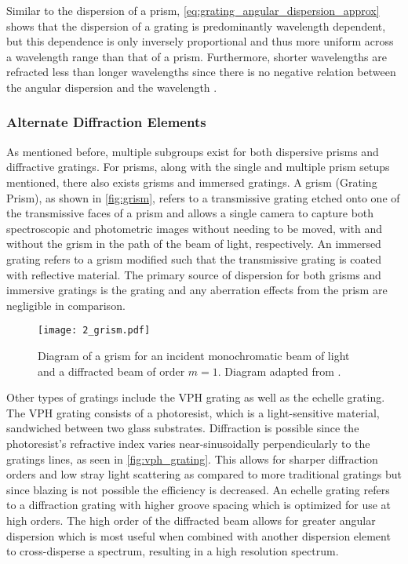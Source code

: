 Similar to the dispersion of a prism, \autoref{eq:grating_angular_dispersion_approx} shows that the dispersion of a grating is predominantly wavelength dependent, but this dependence is only inversely proportional and thus more uniform across a wavelength range than that of a prism.
Furthermore, shorter wavelengths are refracted less than longer wavelengths since there is no negative relation between the angular dispersion and the wavelength \citep{BirneyObsAstro, Hecht_optics,MKS_Handbook}.

\subsubsection{Alternate Diffraction Elements}

As mentioned before, multiple subgroups exist for both dispersive prisms and diffractive gratings.
For prisms, along with the single and multiple prism setups mentioned, there also exists grisms and immersed gratings.
A grism (Grating Prism), as shown in \autoref{fig:grism}, refers to a transmissive grating etched onto one of the transmissive faces of a prism and allows a single camera to capture both spectroscopic and photometric images without needing to be moved, with and without the grism in the path of the beam of light, respectively.
An immersed grating refers to a grism modified such that the transmissive grating is coated with reflective material.
The primary source of dispersion for both grisms and immersive gratings is the grating and any aberration effects from the prism are negligible in comparison.

\enlargethispage{-1\baselineskip}

\begin{figure}[t]
    \centering
    \texttt{[image: 2\_grism.pdf]}
    \caption{
        Diagram of a grism for an incident monochromatic beam of light and a diffracted beam of order $m = 1$.
        Diagram adapted from \cite{BirneyObsAstro}.
    }
    \label{fig:grism}
\end{figure}

Other types of gratings include the \gls{VPH} grating as well as the echelle grating.
The \gls{VPH} grating consists of a photoresist, which is a light-sensitive material, sandwiched between two glass substrates.
Diffraction is possible since the photoresist's refractive index varies near-sinusoidally perpendicularly to the gratings lines, as seen in \autoref{fig:vph_grating}.
This allows for sharper diffraction orders and low stray light scattering as compared to more traditional gratings but since blazing is not possible the efficiency is decreased.
An echelle grating refers to a diffraction grating with higher groove spacing which is optimized for use at high orders.
The high order of the diffracted beam allows for greater angular dispersion which is most useful when combined with another dispersion element to cross-disperse a spectrum, resulting in a high resolution spectrum.

